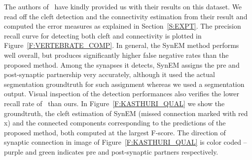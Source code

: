 \documentclass{llncs}
\begin{document}
The authors of~\cite{staffler17synem} have kindly provided us with their results on this dataset. We read off the cleft detection and the connectivity estimation from their result and computed the error measures as explained in Section~\ref{S:EXPT}. The precision recall curve for detecting both cleft and connectivity is plotted in Figure~\ref{F:VERTEBRATE_COMP}. In general, the SynEM method performs well overall, but produces significantly higher false negative rates than the proposed method. Among the synapses it detects, SynEM assigns the pre and post-synaptic partnership very accurately, although it used the actual segmentation groundtruth for such assignment whereas we used a segmentation output. Visual inspection of the detection performances also verifies the lower recall rate of~\cite{staffler17synem} than ours. In Figure~\ref{F:KASTHURI_QUAL} we show the groundtruth, the cleft estimation of SynEM (missed connection marked with red x) and the connected components corresponding to the predictions of the proposed method, both computed at the largest F-score. The direction of synaptic connection in image of Figure~\ref{F:KASTHURI_QUAL} is color coded -- purple and green indicates pre and post-synaptic partners respectively.   
\begin{figure*}[h]
\vspace{-0.2cm}
\begin{center}
\vspace{-0.2cm}
\vspace{-0.5cm}
\caption{\scriptsize Qualitative results on mouse cortex data~\cite{kasthuri15cell}. Left to right, groundtruth annotation, output of SynEM~\cite{staffler17synem} (red x marks missed location), and that of the proposed method. In , purple and green indicates pre and post-synaptic partner respectively. }\label{F:KASTHURI_QUAL}
\end{center}
\vspace{-0.7cm}
\end{figure*}
\end{document}
